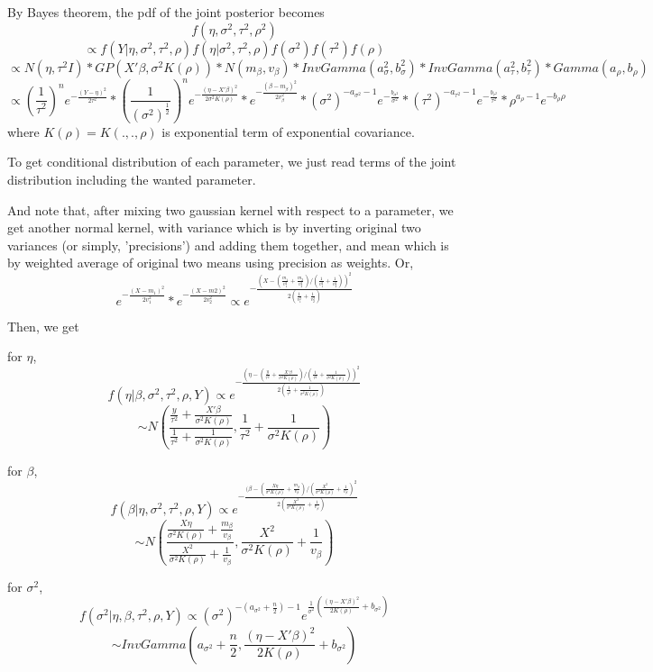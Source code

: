 \documentclass{article}
\begin{document}
By Bayes theorem, the pdf of the joint posterior becomes
\[f(\eta,\sigma^2,\tau^2,\rho^2)\]
\[\propto f(Y|\eta,\sigma^2,\tau^2,\rho)f(\eta|\sigma^2,\tau^2,\rho)f(\sigma^2)f(\tau^2)f(\rho)\]
\[\propto N(\eta,\tau^2I) * GP(X'\beta, \sigma^2 K(\rho))
    * N(m_\beta,v_\beta) * InvGamma(a_\sigma^2, b_\sigma^2) * InvGamma(a_\tau^2, b_\tau^2)
    * Gamma(a_\rho, b_\rho) \]
\[\propto (\frac{1}{\tau^2})^n e^{-\frac{(Y-\eta)^2}{2\tau^2}}
    * (\frac{1}{(\sigma^2)^{\frac{1}{2}}})^n e^{-\frac{(\eta-X'\beta)^2}{2\sigma^2 K(\rho)}}
    * e^{-\frac{(\beta-m_\beta)^2}{2v_\beta^2}}
    * (\sigma^2)^{-a_{\sigma^2}-1} e^{-\frac{b_{\sigma^2}}{\sigma^2}}
    * (\tau^2)^{-a_{\tau^2}-1} e^{-\frac{b_{\tau^2}}{\tau^2}}
    * \rho^{a_{\rho}-1} e^{-b_{\rho}\rho}
    \]
where $K(\rho)=K(.,.,\rho)$ is exponential term of exponential covariance.

To get conditional distribution of each parameter, we just read terms of the joint distribution
including the wanted parameter. 

And note that, after mixing two gaussian kernel with respect to a parameter,
we get another normal kernel, with variance which is by inverting original two variances (or simply, 'precisions') and adding them together,
and mean which is by weighted average of original two means using precision as weights. Or,
\[e^{-\frac{(X-m_1)^2}{2v_1^2}} * e^{-\frac{(X-m2)^2}{2v_2^2}}
    \propto e^{-\frac{(X-(\frac{m_1}{v_1^2} + \frac{m_2}{v_2^2})/(\frac{1}{v_1^2} + \frac{1}{v_2^2}))^2}{2(\frac{1}{v_1^2}+\frac{1}{v_2^2})}}\]

Then, we get

for $\eta$,
\[f(\eta|\beta,\sigma^2,\tau^2,\rho,Y) \propto e^{-\frac{(\eta - (\frac{y}{\tau^2} + \frac{X'\beta}{\sigma^2 K(\rho)}) / (\frac{1}{\tau^2}+\frac{1}{\sigma^2 K(\rho)}))^2}{2(\frac{1}{\tau^2}+\frac{1}{\sigma^2 K(\rho)})}}
\]
\[\sim N(\frac{\frac{y}{\tau^2} + \frac{X'\beta}{\sigma^2 K(\rho)}}{\frac{1}{\tau^2}+\frac{1}{\sigma^2 K(\rho)}}, \frac{1}{\tau^2}+\frac{1}{\sigma^2 K(\rho)})\]

for $\beta$,
\[f(\beta|\eta,\sigma^2,\tau^2,\rho,Y) \propto e^{-\frac{(\beta - (\frac{X\eta}{\sigma^2 K(\rho)} + \frac{m_\beta}{v_\beta}) / (\frac{X^2}{\sigma^2 K(\rho)}+\frac{1}{v_\beta})^2}{2(\frac{X^2}{\sigma^2 K(\rho)}+\frac{1}{v_\beta})}}
\]
\[\sim N(\frac{\frac{X\eta}{\sigma^2 K(\rho)} + \frac{m_\beta}{v_\beta}}{\frac{X^2}{\sigma^2 K(\rho)}+\frac{1}{v_\beta}}, \frac{X^2}{\sigma^2 K(\rho)}+\frac{1}{v_\beta})\]

for $\sigma^2$,
\[f(\sigma^2|\eta,\beta,\tau^2,\rho,Y) \propto (\sigma^2)^{-(a_{\sigma^2}+\frac{n}{2})-1} e^{\frac{1}{\sigma^2}(\frac{(\eta - X'\beta)^2}{2K(\rho)}+b_{\sigma^2})}
\]
\[\sim InvGamma(a_{\sigma^2}+\frac{n}{2}, \frac{(\eta - X'\beta)^2}{2K(\rho)}+b_{\sigma^2})\]
\end{document}
